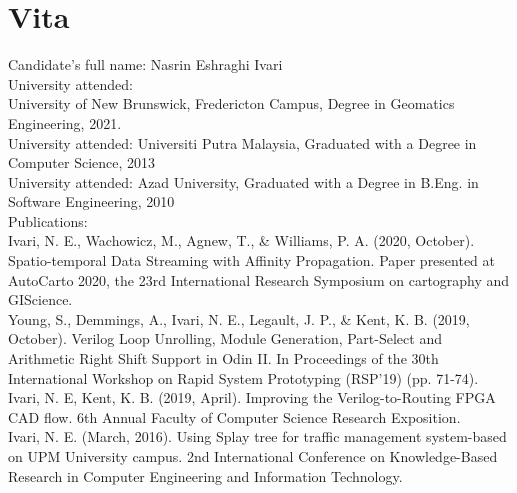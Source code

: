 \clearpage
{}  %
\chapter*{Vita}
\pagestyle{empty}
\thispagestyle{empty}
\singlespacing
Candidate's full name: Nasrin Eshraghi Ivari\\
University attended: \\

University of New Brunswick, Fredericton Campus, Degree in Geomatics Engineering, 2021.\\

University attended: Universiti Putra Malaysia, Graduated with a Degree in Computer Science, 2013\\

University attended: Azad University, Graduated with a Degree in B.Eng. in Software Engineering, 2010\\


Publications:\\

Ivari, N. E., Wachowicz, M., Agnew, T., \& Williams, P. A. (2020, October). Spatio-temporal Data Streaming with Affinity Propagation. Paper presented at AutoCarto 2020, the 23rd International Research Symposium on cartography and GIScience.\\


Young, S., Demmings, A., Ivari, N. E., Legault, J. P., \& Kent, K. B. (2019, October). Verilog Loop Unrolling, Module Generation, Part-Select and Arithmetic Right Shift Support in Odin II. In Proceedings of the 30th International Workshop on Rapid System Prototyping (RSP'19) (pp. 71-74).\\


Ivari, N. E, Kent, K. B. (2019, April). Improving the Verilog-to-Routing FPGA CAD flow. 6th Annual Faculty of Computer Science Research Exposition.\\


Ivari, N. E. (March, 2016). Using Splay tree for traffic management system-based on UPM University campus. 2nd International Conference on Knowledge-Based Research in Computer Engineering and Information Technology.

